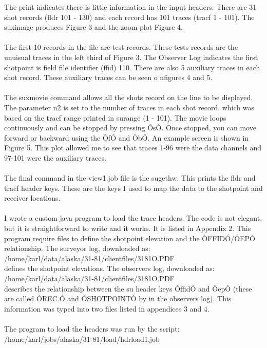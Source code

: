 The print indicates there is little information in the input headers.  There are 31 shot records (fldr 101 - 130) and each record has 101 traces (tracf 1 - 101).  The suximage produces Figure 3 and the zoom plot Figure 4.\\
\\
The first 10 records in the file are test records.  These tests records are the unuisual traces in the left third of Figure 3.  The Observer Log indicates the first shotpoint is field file identifier (ffid) 110.  There are also 5 auxiliary traces in each shot record.  These auxiliary traces can be seen o nfigures 4 and 5. \\
\\
The suxmovie command allows all the shots record on the line to be displayed.  The parameter n2 is set to the number of traces in each shot record, which was based on the tracf range printed in surange (1 - 101).  The movie loops continuously and can be stopped by pressing ÒsÓ.  Once stopped, you can move forward or backward using the ÒfÓ and ÒbÓ.  An example screen is shown in Figure 5.  This plot allowed me to see that traces 1-96 were the data channels and 97-101 were the auxiliary traces.\\
\\
The final command in the view1.job file is the sugethw.  This prints the fldr and tracf header keys.  These are the keys I used to map the data to the shotpoint and receiver locations.\\
\\
I wrote a custom java program to load the trace headers.  The code is not elegant, but it is straightforward to write and it works.  It is listed in Appendix 2.  This program require files to define the shotpoint elevation and the ÒFFIDÓ/ÓEPÓ relationship.  The surveyor log, downloaded as:\\
/home/karl/data/alaska/31-81/clientfiles/3181O.PDF \\
defines the shotpoint elevations.  The observers log, downloaded as:\\
/home/karl/data/alaska/31-81/clientfiles/3181O.PDF \\
describes the relationship between the su header keys ÒffidÓ  and ÒepÓ  (these are called ÒREC.Ó and ÒSHOTPOINTÓ by in the observers log).   This information was typed into two files listed in appendices 3 and 4.\\
\\
The program to load the headers was run by the script:\\
/home/karl/jobs/alaska/31-81/load/hdrload1.job \\
